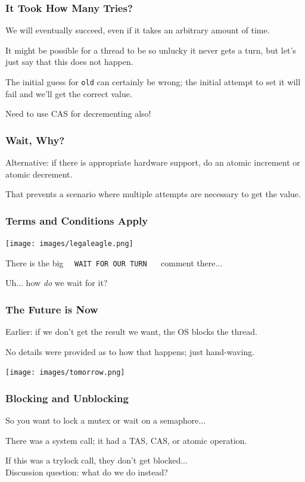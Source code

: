 \begin{frame}
\frametitle{It Took How Many Tries?}

We will eventually succeed, even if it takes an arbitrary amount of time.

 It might be possible for a thread to be so unlucky it never gets a turn, but let's just say that this does not happen.

The initial guess for \texttt{old} can certainly be wrong; the initial attempt to set it will fail and we'll get the correct value.

Need to use CAS for decrementing also!

\end{frame}

\begin{frame}
\frametitle{Wait, Why?}

Alternative: if there is appropriate hardware support, do an atomic increment or atomic decrement.

That prevents a scenario where multiple attempts are necessary to get the value. 

\end{frame}

\begin{frame}
\frametitle{Terms and Conditions Apply}

\begin{center}
	\texttt{[image: images/legaleagle.png]}
\end{center}

There is the big ~~\texttt{WAIT FOR OUR TURN} ~~ comment there...

Uh... how \textit{do} we wait for it?

\end{frame}

\begin{frame}
\frametitle{The Future is Now}

Earlier: if we don't get the result we want, the OS blocks the thread.

No details were provided as to how that happens; just hand-waving.

\begin{center}
	\texttt{[image: images/tomorrow.png]}
\end{center}

\end{frame}

\begin{frame}
\frametitle{Blocking and Unblocking}

So you want to lock a mutex or wait on a semaphore...

There was a system call; it had a TAS, CAS, or atomic operation.

If this was a trylock call, they don't get blocked...\\
\quad Discussion question: what do we do instead?

\end{frame}

